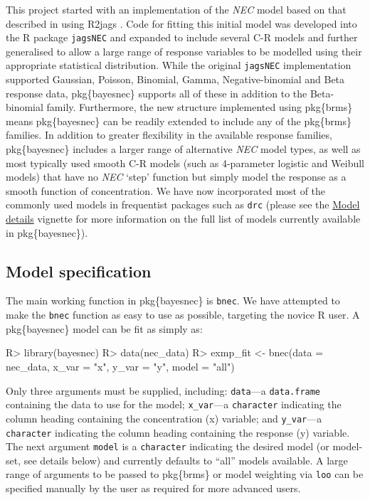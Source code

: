 \documentclass[
]{jss}
\begin{document}
This project started with an implementation of the \emph{NEC} model
based on that described in \citep{Fox2010, Pires2002} using R2jags
\citep{Su2015}. Code for fitting this initial model was developed into
the R package \texttt{jagsNEC} and expanded to include several C-R
models and further generalised to allow a large range of response
variables to be modelled using their appropriate statistical
distribution. While the original \texttt{jagsNEC} implementation
supported Gaussian, Poisson, Binomial, Gamma, Negative-binomial and Beta
response data, pkg\{bayesnec\} supports all of these in addition to the
Beta-binomial family. Furthermore, the new structure implemented using
pkg\{brms\} means pkg\{bayesnec\} can be readily extended to include any
of the pkg\{brms\} families. In addition to greater flexibility in the
available response families, pkg\{bayesnec\} includes a larger range of
alternative \emph{NEC} model types, as well as most typically used
smooth C-R models (such as 4-parameter logistic and Weibull models) that
have no \emph{NEC} `step' function but simply model the response as a
smooth function of concentration. We have now incorporated most of the
commonly used models in frequentist packages such as \texttt{drc}
\citep{Ritz2016} (please see the
\href{https://open-aims.github.io/bayesnec/articles/example2b.html}{Model
details} vignette for more information on the full list of models
currently available in pkg\{bayesnec\}).

\hypertarget{model-specification}{%
\subsection{Model specification}\label{model-specification}}

The main working function in pkg\{bayesnec\} is \texttt{bnec}. We have
attempted to make the \texttt{bnec} function as easy to use as possible,
targeting the novice R user. A pkg\{bayesnec\} model can be fit as
simply as:

\begin{CodeChunk}
\begin{CodeInput}
R> library(bayesnec)
R> data(nec_data)
R> exmp_fit <- bnec(data = nec_data, x_var = "x", y_var = "y", model = "all")
\end{CodeInput}
\end{CodeChunk}

Only three arguments must be supplied, including: \texttt{data}---a
\texttt{data.frame} containing the data to use for the model;
\texttt{x\_var}---a \texttt{character} indicating the column heading
containing the concentration (x) variable; and \texttt{y\_var}---a
\texttt{character} indicating the column heading containing the response
(y) variable. The next argument \texttt{model} is a \texttt{character}
indicating the desired model (or model-set, see details below) and
currently defaults to ``all'' models available. A large range of
arguments to be passed to pkg\{brms\} or model weighting via
\texttt{loo} can be specified manually by the user as required for more
advanced users.
\end{document}
